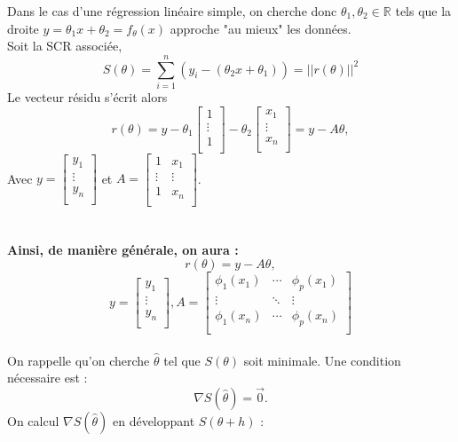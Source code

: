          Dans le cas d'une régression linéaire simple, on cherche donc $\theta_1, \theta_2 \in \mathbb{R}$ tels que la droite $y = \theta_1 x + \theta_2 = f_\theta(x)$ approche "au mieux" les données.\\ Soit la SCR associée, $$S(\theta) = \sum^n_{i=1}(y_i-(\theta_2 x + \theta_1)) = ||r(\theta)||^2$$
         Le vecteur résidu s'écrit alors
         $$r(\theta) = y - \theta_1 \begin{bmatrix}1 \\\vdots \\1 \\\end{bmatrix}
         - \theta_2\begin{bmatrix}x_1 \\\vdots \\x_n \\\end{bmatrix} = y - A\theta,$$
         Avec $y = \begin{bmatrix}y_1 \\\vdots \\y_n \\\end{bmatrix} $ et $A = \begin{bmatrix}1&x_1 \\\vdots&\vdots \\1&x_n \\\end{bmatrix}$.
         \\\\\\\textbf{Ainsi, de manière générale, on aura :} 
         $$
         r(\theta) = y - A\theta,
         $$
         $$
            y = \begin{bmatrix}y_1 \\\vdots \\y_n \\\end{bmatrix}, A = \begin{bmatrix}\phi_1(x_1)&\cdots&\phi_p(x_1) \\\vdots&\ddots&\vdots \\\phi_1(x_n)&\cdots&\phi_p(x_n) \\\end{bmatrix}
         $$
         \\On rappelle qu'on cherche $\hat{\theta}$ tel que $S(\theta)$ soit minimale. Une condition nécessaire est :
         $$\nabla S(\hat{\theta})=\Vec{0}.$$
         On calcul $\nabla S(\hat{\theta})$ en développant $S(\theta + h)$ :
